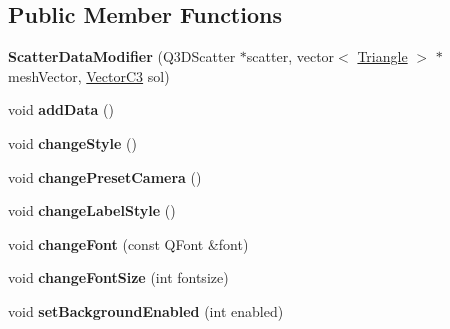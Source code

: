 \subsection*{Public Member Functions}
\begin{DoxyCompactItemize}
\item 
{\bfseries Scatter\+Data\+Modifier} (Q3\+D\+Scatter $\ast$scatter, vector$<$ \hyperlink{struct_triangle}{Triangle} $>$ $\ast$mesh\+Vector, \hyperlink{class_vector_c3}{Vector\+C3} sol)\hypertarget{class_scatter_data_modifier_a09ad817005a3f86cc4e4505ede9a578b}{}\label{class_scatter_data_modifier_a09ad817005a3f86cc4e4505ede9a578b}

\item 
void {\bfseries add\+Data} ()\hypertarget{class_scatter_data_modifier_a5812ae3ac1e633b334c30dd717de9fe4}{}\label{class_scatter_data_modifier_a5812ae3ac1e633b334c30dd717de9fe4}

\item 
void {\bfseries change\+Style} ()\hypertarget{class_scatter_data_modifier_a9965097d382878cda8ea23be72582351}{}\label{class_scatter_data_modifier_a9965097d382878cda8ea23be72582351}

\item 
void {\bfseries change\+Preset\+Camera} ()\hypertarget{class_scatter_data_modifier_abf18c88b5e1c744f8fffb7179b748b75}{}\label{class_scatter_data_modifier_abf18c88b5e1c744f8fffb7179b748b75}

\item 
void {\bfseries change\+Label\+Style} ()\hypertarget{class_scatter_data_modifier_ad011038aa1c17d01603c2d01c383e7af}{}\label{class_scatter_data_modifier_ad011038aa1c17d01603c2d01c383e7af}

\item 
void {\bfseries change\+Font} (const Q\+Font \&font)\hypertarget{class_scatter_data_modifier_ab8afdc192cffb4a6332eef36cc83bc12}{}\label{class_scatter_data_modifier_ab8afdc192cffb4a6332eef36cc83bc12}

\item 
void {\bfseries change\+Font\+Size} (int fontsize)\hypertarget{class_scatter_data_modifier_ac9cc978e058c0d2e92aa39fa46748521}{}\label{class_scatter_data_modifier_ac9cc978e058c0d2e92aa39fa46748521}

\item 
void {\bfseries set\+Background\+Enabled} (int enabled)\hypertarget{class_scatter_data_modifier_a7ec5ec0558a9ec6b8dc924428bc9568a}{}\label{class_scatter_data_modifier_a7ec5ec0558a9ec6b8dc924428bc9568a}


\end{DoxyCompactItemize}
